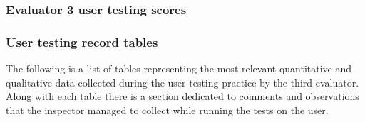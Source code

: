 \subsubsection{Evaluator 3 user testing scores}

\subsubsection*{User testing record tables}
The following is a list of tables representing the most relevant quantitative and qualitative data collected during the user testing practice by the third evaluator.
Along with each table there is a section dedicated to comments and observations that the inspector managed to collect while running the tests on the user.

\vspace{0.8cm}

